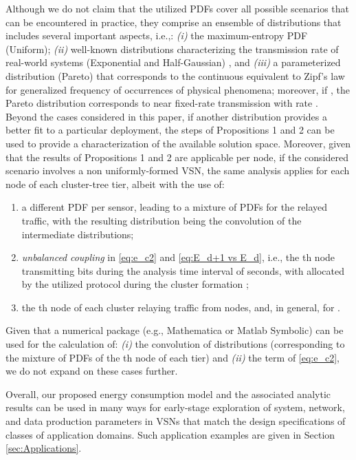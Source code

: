 \documentclass[twocolumn,english]{IEEEtran}
\theoremstyle{plain}
\theoremstyle{definition}
\begin{document}
Although we do not claim that the utilized PDFs cover all possible
scenarios that can be encountered in practice, they comprise an ensemble
of distributions that includes several important aspects, i.e.,: \emph{(i)}
the maximum-entropy PDF (Uniform); \emph{(ii)} well-known distributions
characterizing the transmission rate of real-world systems (Exponential
and Half-Gaussian) \cite{LamGoodmanDCT,foo2008analytical,DBLP:journals/tip/AndreopoulosP08,DBLP:conf/icip/TagliasacchiTS06,Dai:2009:UTM:1653034.1653052},
and \emph{(iii)} a parameterized distribution (Pareto) that corresponds
to the continuous equivalent to Zipf's law for generalized frequency
of occurrences of physical phenomena; moreover, if , the
Pareto distribution corresponds to near fixed-rate transmission with
rate . Beyond the cases considered in this paper, if another
distribution provides a better fit to a particular deployment, the
steps of Propositions 1 and 2 can be used to provide a characterization
of the available solution space. Moreover, given that the results
of Propositions 1 and 2 are applicable per node, if the considered
scenario involves a non uniformly-formed VSN, the same analysis applies
for each node of each cluster-tree tier, albeit with the use of: 
\begin{enumerate}
\item a different PDF per sensor, leading to a mixture of PDFs for the relayed
traffic, with the resulting distribution being the convolution of
the intermediate distributions; 
\item \emph{unbalanced} \emph{coupling} in \eqref{eq:e_c2} and \eqref{eq:E_d+1 vs E_d},
i.e., the th node transmitting  bits during the analysis
time interval of  seconds, with  allocated by the utilized
protocol during the cluster formation \cite{AlvesClusterTreeGTS,citeulike:3839709,koubaa2006gts,LeungMACEssentials}; 
\item the th node of each cluster relaying traffic from  nodes,
and, in general,  for . 
\end{enumerate}
Given that a numerical package (e.g., Mathematica or Matlab Symbolic)
can be used for the calculation of: \emph{(i)} the convolution of
 distributions 
(corresponding to the mixture of  PDFs of the th node
of each tier) and \emph{(ii)} the 
term of \eqref{eq:e_c2}, we do not expand on these cases further.

Overall, our proposed energy consumption model and the associated
analytic results can be used in many ways for early-stage exploration
of system, network, and data production parameters in VSNs that match
the design specifications of classes of application domains. Such
application examples are given in Section \ref{sec:Applications}.
\end{document}
